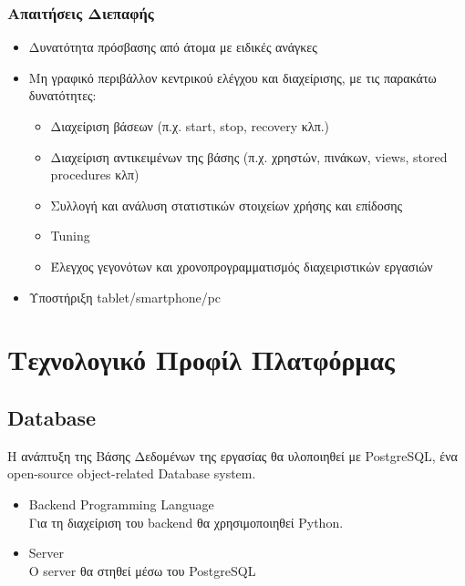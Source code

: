 \documentclass[letterpaper,6pt]{article}
\begin{document}
\subsubsection{Απαιτήσεις Διεπαφής}
\begin{itemize}
  \item Δυνατότητα πρόσβασης από άτομα με ειδικές ανάγκες
  \item Μη γραφικό περιβάλλον κεντρικού ελέγχου και διαχείρισης, με τις παρακάτω δυνατότητες:
    \begin{itemize}
      \item Διαχείριση βάσεων (π.χ. start, stop, recovery κλπ.)
      \item Διαχείριση αντικειμένων της βάσης (π.χ. χρηστών, πινάκων, views, stored procedures κλπ)
      \item Συλλογή και ανάλυση στατιστικών στοιχείων χρήσης και επίδοσης
      \item Tuning
      \item Έλεγχος γεγονότων και χρονοπρογραμματισμός διαχειριστικών εργασιών
    \end{itemize}
  \item Υποστήριξη tablet/smartphone/pc
\end{itemize}
  


\section{Τεχνολογικό Προφίλ Πλατφόρμας}

\subsection{Database}

Η ανάπτυξη της Βάσης Δεδομένων της εργασίας θα υλοποιηθεί με PostgreSQL, ένα open-source object-related Database system.
\begin{itemize}
\item Backend Programming Language \\
Για τη διαχείριση του backend θα χρησιμοποιηθεί Python.
\item Server \\
Ο server θα στηθεί μέσω του PostgreSQL
\end{itemize}
\end{document}
